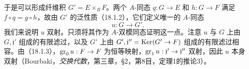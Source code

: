 于是可以形成纤维积 $G'=E\times_BF$。两个 $A$-同态 $q:G\to E$ 和 $h:G\to F$ 满足 $f\circ q=g\circ h$，故由 $G'$ 的泛性质（18.1.2），它们定义唯一的 $A$-同态
\[
 u:G\longrightarrow G'.
\]
我们来说明 $u$ 双射。只须将其作为 $A$-双模同态证明这一点。注意 $u$ 与 $G$ 上由 $G,\mathfrak j'$ 组成的有限滤过，以及 $G'$ 上由 $G',\mathfrak j''=\operatorname{Ker}(G'\to F)$ 组成的有限滤过相容。由（18.1.3），$\operatorname{gr}_0u:F\to F$ 为恒等映射，$\operatorname{gr}_1u:\mathfrak j'\to\mathfrak j''$ 双射，因此 $u$ 本身双射（Bourbaki，\textit{交换代数}，第三章，§2，第8目，定理1的推论3）。
